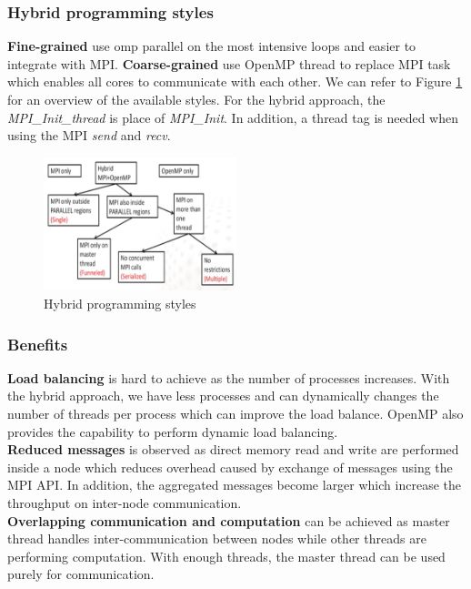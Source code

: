 \documentclass[12pt]{article}
\begin{document}
\subsubsection{Hybrid programming styles}

\textbf{Fine-grained} use omp parallel on the most intensive loops and easier to
integrate with MPI. \textbf{Coarse-grained} use OpenMP thread to replace MPI task which
enables all cores to communicate with each other. We can refer to Figure
\ref{fig:hybridstyles} for an overview of the available styles. For the hybrid
approach, the \textit{MPI\_Init\_thread} is place of \textit{MPI\_Init}. In
addition, a thread tag is needed when using the MPI \textit{send} and \textit{recv}.

\begin{figure}[H]
  \centering
  \includegraphics[width=0.5\textwidth, height=0.3\textwidth]{hybridstyles.png}
  \caption{Hybrid programming styles}
  \label{fig:hybridstyles}
\end{figure}

\subsubsection{Benefits}

\textbf{Load balancing} is hard to achieve as the number of processes increases.
With the hybrid approach, we have less processes and can dynamically changes the
number of threads per process which can improve the load balance. OpenMP also
provides the capability to perform dynamic load balancing. \\

\noindent \textbf{Reduced messages} is observed as direct memory read and write are
performed inside a node which reduces overhead caused by exchange of messages
using the MPI API. In addition, the aggregated messages become larger which
increase the throughput on inter-node communication. \\

\noindent \textbf{Overlapping communication and computation} can be achieved as master
thread handles inter-communication between nodes while other threads are
performing computation. With enough threads, the master thread can be used
purely for communication. \\
\end{document}
